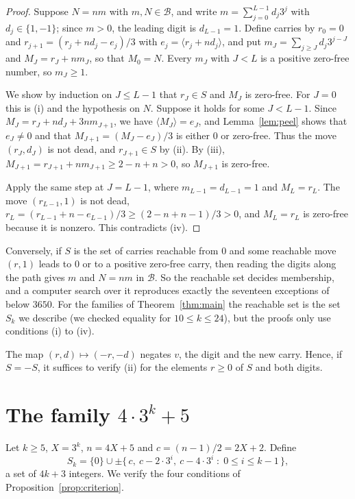 \documentclass[11pt]{amsart}
\theoremstyle{definition}
\newcommand{\bal}[1]{\langle #1\rangle}
\newcommand{\B}{\mathcal{B}}
\begin{document}
\begin{proof}
Suppose $N=nm$ with $m,N\in\B$, and write $m=\sum_{j=0}^{L-1}d_j3^j$ with $d_j\in\{1,-1\}$; since
$m>0$, the leading digit is $d_{L-1}=1$. Define carries by $r_0=0$ and
$r_{j+1}=(r_j+nd_j-e_j)/3$ with $e_j=\bal{r_j+nd_j}$, and put $m_J=\sum_{j\ge J}d_j3^{j-J}$ and
$M_J=r_J+nm_J$, so that $M_0=N$. Every $m_J$ with $J<L$ is a positive zero-free number, so
$m_J\ge 1$.

We show by induction on $J\le L-1$ that $r_J\in S$ and $M_J$ is zero-free. For $J=0$ this is (i) and
the hypothesis on $N$. Suppose it holds for some $J<L-1$. Since $M_J=r_J+nd_J+3nm_{J+1}$, we have
$\bal{M_J}=e_J$, and Lemma~\ref{lem:peel} shows that $e_J\ne 0$ and that
$M_{J+1}=(M_J-e_J)/3$ is either $0$ or zero-free. Thus the move $(r_J,d_J)$ is not dead, and
$r_{J+1}\in S$ by (ii). By (iii), $M_{J+1}=r_{J+1}+nm_{J+1}\ge 2-n+n>0$, so $M_{J+1}$ is zero-free.

Apply the same step at $J=L-1$, where $m_{L-1}=d_{L-1}=1$ and $M_L=r_L$. The move $(r_{L-1},1)$ is not
dead, $r_L=(r_{L-1}+n-e_{L-1})/3\ge(2-n+n-1)/3>0$, and $M_L=r_L$ is zero-free because it is nonzero.
This contradicts (iv).
\end{proof}

Conversely, if $S$ is the set of carries reachable from $0$ and some reachable move $(r,1)$ leads to
$0$ or to a positive zero-free carry, then reading the digits along the path gives $m$ and $N=nm$ in
$\B$. So the reachable set decides membership, and a computer search over it reproduces exactly the
seventeen exceptions of \cite{BMRS} below $3650$. For the families of Theorem~\ref{thm:main} the
reachable set is the set $S_k$ we describe (we checked equality for $10\le k\le 24$), but the proofs
only use conditions (i) to (iv).

The map $(r,d)\mapsto(-r,-d)$ negates $v$, the digit and the new carry. Hence, if $S=-S$, it suffices
to verify (ii) for the elements $r\ge 0$ of $S$ and both digits.

\section{The family \texorpdfstring{$4\cdot 3^k+5$}{4 3\^{}k + 5}}\label{sec:first}

Let $k\ge 5$, $X=3^k$, $n=4X+5$ and $c=(n-1)/2=2X+2$. Define
\[
S_k=\{0\}\cup\pm\{\,c,\ c-2\cdot 3^i,\ c-4\cdot 3^i \;:\; 0\le i\le k-1\,\},
\]
a set of $4k+3$ integers. We verify the four conditions of Proposition~\ref{prop:criterion}.
\end{document}
